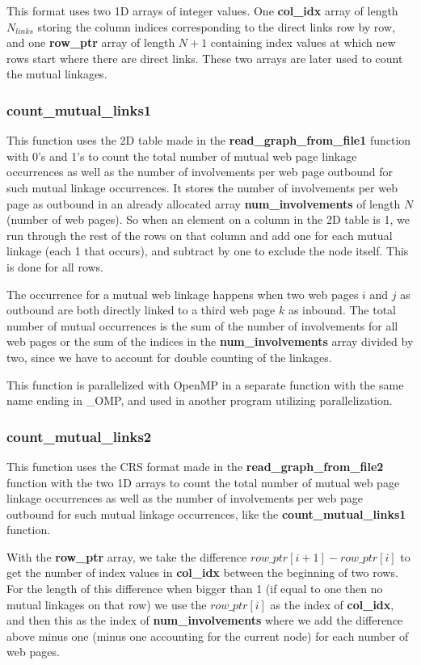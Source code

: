 \documentclass[12pt,a4paper,english]{article}
\begin{document}
This format uses two 1D arrays of integer values. One \textbf{col\_idx} array of length $N_{links}$ storing the column indices corresponding to the direct links row by row, and one \textbf{row\_ptr} array of length $N+1$ containing index values at which new rows start where there are direct links. These two arrays are later used to count the mutual linkages.

\subsubsection{count\_mutual\_links1}
This function uses the 2D table made in the \textbf{read\_graph\_from\_file1} function with 0's and 1's to count the total number of mutual web page linkage occurrences as well as the number of involvements per web page outbound for such mutual linkage occurrences. It stores the number of involvements per web page as outbound in an already allocated array \textbf{num\_involvements} of length $N$ (number of web pages). So when an element on a column in the 2D table is 1, we run through the rest of the rows on that column and add one for each mutual linkage (each 1 that occurs), and subtract by one to exclude the node itself. This is done for all rows.

The occurrence for a mutual web linkage happens when two web pages $i$ and $j$ as outbound are both directly linked to a third web page $k$ as inbound. The total number of mutual occurrences is the sum of the number of involvements for all web pages or the sum of the indices in the \textbf{num\_involvements} array divided by two, since we have to account for double counting of the linkages.

This function is parallelized with OpenMP in a separate function with the same name ending in \_OMP, and used in another program utilizing parallelization.

\subsubsection{count\_mutual\_links2}
This function uses the CRS format made in the \textbf{read\_graph\_from\_file2} function with the two 1D arrays to count the total number of mutual web page linkage occurrences as well as the number of involvements per web page outbound for such mutual linkage occurrences, like the \textbf{count\_mutual\_links1} function.

With the \textbf{row\_ptr} array, we take the difference $row\_ptr[i+1]-row\_ptr[i]$ to get the number of index values in \textbf{col\_idx} between the beginning of two rows. For the length of this difference when bigger than 1 (if equal to one then no mutual linkages on that row) we use the $row\_ptr[i]$ as the index of \textbf{col\_idx}, and then this as the index of \textbf{num\_involvements} where we add the difference above minus one (minus one accounting for the current node) for each number of web pages.
\end{document}
